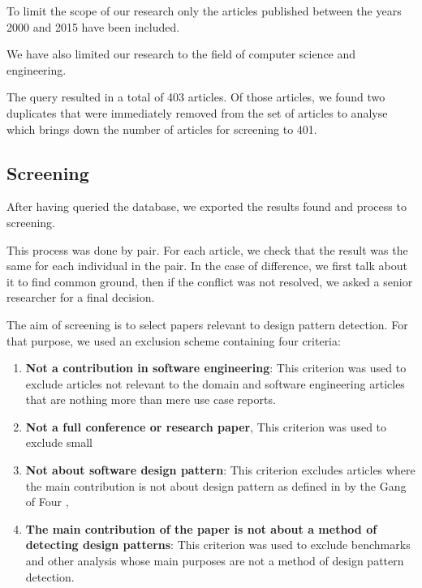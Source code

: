 \documentclass[letterpaper, 10 pt, conference]{ieeeconf}  %
\begin{document}
To limit the scope of our research only the articles published between the years
2000 and 2015 have been included. 

We have also limited our research to the field of computer science and
engineering.

The query resulted in a total of 403 articles.
Of those articles, we found two duplicates that were immediately removed from
the set of articles to analyse which brings down the number of articles for
screening to 401.

\subsection{Screening}

After having queried the database, we exported the results found and process to
screening. 

This process was done by pair.
For each article, we check that the result was the same for each individual in
the pair.
In the case of difference, we first talk about it to find common ground, then
if the conflict was not resolved, we asked a senior researcher for a final
decision.

The aim of screening is to select papers relevant to design pattern detection.
For that purpose, we used an exclusion scheme containing four criteria:

\begin{enumerate}
  \item \textbf{Not a contribution in software engineering}: 
    This criterion was used to exclude articles not relevant to the domain and
    software engineering articles that are nothing more than mere use case
    reports.
  \item \textbf{Not a full conference or research paper},
    This criterion was used to exclude small
  \item \textbf{Not about software design pattern}:
    This criterion excludes articles where the main contribution is not about
    design pattern as defined in by the Gang of Four ,
  \item \textbf{The main contribution of the paper is not about a method of detecting design patterns}:
    This criterion was used to exclude benchmarks and other analysis whose main
    purposes are not a method of design pattern detection.
\end{enumerate}
\end{document}
